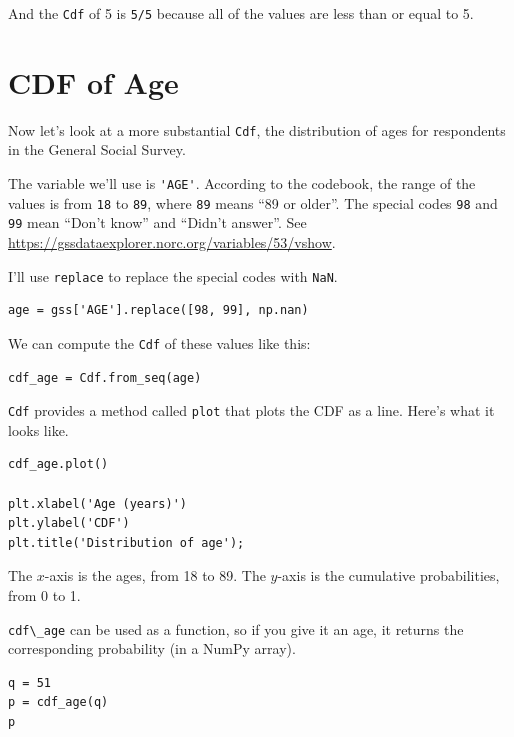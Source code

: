 And the \passthrough{\lstinline!Cdf!} of 5 is
\passthrough{\lstinline!5/5!} because all of the values are less than or
equal to 5.

\hypertarget{cdf-of-age}{%
\section{CDF of Age}\label{cdf-of-age}}

Now let's look at a more substantial \passthrough{\lstinline!Cdf!}, the
distribution of ages for respondents in the General Social Survey.

The variable we'll use is \passthrough{\lstinline!'AGE'!}. According to
the codebook, the range of the values is from
\passthrough{\lstinline!18!} to \passthrough{\lstinline!89!}, where
\passthrough{\lstinline!89!} means ``89 or older''. The special codes
\passthrough{\lstinline!98!} and \passthrough{\lstinline!99!} mean
``Don't know'' and ``Didn't answer''. See
\url{https://gssdataexplorer.norc.org/variables/53/vshow}.

I'll use \passthrough{\lstinline!replace!} to replace the special codes
with \passthrough{\lstinline!NaN!}.

\begin{lstlisting}[]
age = gss['AGE'].replace([98, 99], np.nan)
\end{lstlisting}

We can compute the \passthrough{\lstinline!Cdf!} of these values like
this:

\begin{lstlisting}[]
cdf_age = Cdf.from_seq(age)
\end{lstlisting}

\passthrough{\lstinline!Cdf!} provides a method called
\passthrough{\lstinline!plot!} that plots the CDF as a line. Here's what
it looks like.

\begin{lstlisting}[]
cdf_age.plot()

plt.xlabel('Age (years)')
plt.ylabel('CDF')
plt.title('Distribution of age');
\end{lstlisting}

The \(x\)-axis is the ages, from 18 to 89. The \(y\)-axis is the
cumulative probabilities, from 0 to 1.

\passthrough{\lstinline!cdf\_age!} can be used as a function, so if you
give it an age, it returns the corresponding probability (in a NumPy
array).

\begin{lstlisting}[]
q = 51
p = cdf_age(q)
p
\end{lstlisting}

